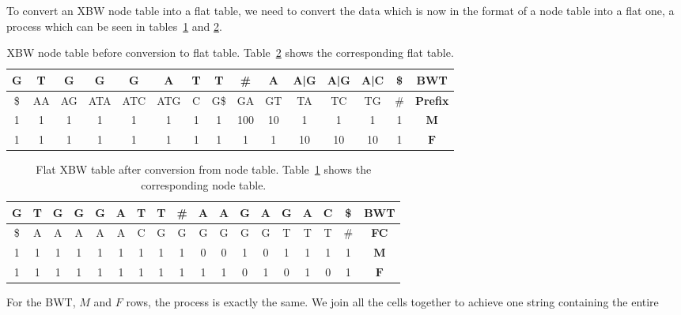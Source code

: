 \documentclass[a4paper,12pt,twoside,BCOR=10mm]{scrbook}
\begin{document}
To convert an XBW node table into a flat table, we need to convert the data which is now in the format of a 
node table into a flat one, a process which can be seen in 
tables~\ref{table:evo_node_to_flat_node} and \ref{table:evo_node_to_flat_flat}. 
{
\renewcommand{\tabcolsep}{5pt}
\begin{table}[htb]
\centering
\caption[XBW node table before conversion to flat table]{XBW node table before conversion to flat table. 
Table~\ref{table:evo_node_to_flat_flat} shows the corresponding flat table.}
\begin{tabular}{ | c | c | c | c | c | c | c | c | c | c | c | c | c | c | c | }
\hline
G & T & G & G & G & A & T & T & \# & A & A|G & A|G & A|C & \$ & \textbf{BWT} \\ \hline 
\$ & AA & AG & ATA & ATC & ATG & C & G\$ & GA & GT & TA & TC & TG & \# & \textbf{Prefix} \\ \hline 
1 & 1 & 1 & 1 & 1 & 1 & 1 & 1 & 100 & 10 & 1 & 1 & 1 & 1 & $\boldsymbol{M}$ \\ \hline 
1 & 1 & 1 & 1 & 1 & 1 & 1 & 1 & 1 & 1 & 10 & 10 & 10 & 1 & $\boldsymbol{F}$ \\ \hline 
\end{tabular}
\label{table:evo_node_to_flat_node}
\end{table}
}
\begin{table}[htb]
\centering
\caption[Flat XBW table after conversion from node table]{Flat XBW table after conversion from node table. 
Table~\ref{table:evo_node_to_flat_node} shows the corresponding node table.}
\begin{tabular}{ | c | c | c | c | c | c | c | c | c | c | c | c | c | c | c | c | c | c | }
\hline
G & T & G & G & G & A & T & T & \# & A & A & G & A & G & A & C & \$ & \textbf{BWT} \\ \hline 
\$ & A & A & A & A & A & C & G & G & G & G & G & G & T & T & T & \# & \textbf{FC} \\ \hline 
1 & 1 & 1 & 1 & 1 & 1 & 1 & 1 & 1 & 0 & 0 & 1 & 0 & 1 & 1 & 1 & 1 & $\boldsymbol{M}$ \\ \hline 
1 & 1 & 1 & 1 & 1 & 1 & 1 & 1 & 1 & 1 & 1 & 0 & 1 & 0 & 1 & 0 & 1 & $\boldsymbol{F}$ \\ \hline
\end{tabular}
\label{table:evo_node_to_flat_flat}
\end{table}
For the BWT, $ M $ and $ F $ rows, the process is exactly the same. 
We join all the cells together to achieve one string containing the entire 
\end{document}
